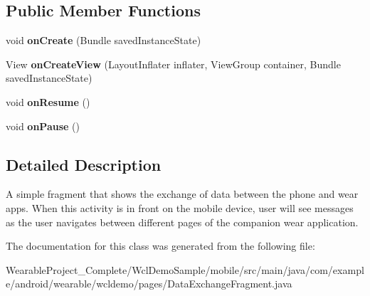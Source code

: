 \subsection*{Public Member Functions}
\begin{DoxyCompactItemize}
\item 
void {\bfseries on\+Create} (Bundle saved\+Instance\+State)\hypertarget{classcom_1_1example_1_1android_1_1wearable_1_1wcldemo_1_1pages_1_1DataExchangeFragment_aea54a1ae5c0d4d7af0897b1f9a17ec26}{}\label{classcom_1_1example_1_1android_1_1wearable_1_1wcldemo_1_1pages_1_1DataExchangeFragment_aea54a1ae5c0d4d7af0897b1f9a17ec26}

\item 
View {\bfseries on\+Create\+View} (Layout\+Inflater inflater, View\+Group container, Bundle saved\+Instance\+State)\hypertarget{classcom_1_1example_1_1android_1_1wearable_1_1wcldemo_1_1pages_1_1DataExchangeFragment_a4026352a4f55d36345545326fcfeff39}{}\label{classcom_1_1example_1_1android_1_1wearable_1_1wcldemo_1_1pages_1_1DataExchangeFragment_a4026352a4f55d36345545326fcfeff39}

\item 
void {\bfseries on\+Resume} ()\hypertarget{classcom_1_1example_1_1android_1_1wearable_1_1wcldemo_1_1pages_1_1DataExchangeFragment_a051a8718e43ef3fc662eb776e890f502}{}\label{classcom_1_1example_1_1android_1_1wearable_1_1wcldemo_1_1pages_1_1DataExchangeFragment_a051a8718e43ef3fc662eb776e890f502}

\item 
void {\bfseries on\+Pause} ()\hypertarget{classcom_1_1example_1_1android_1_1wearable_1_1wcldemo_1_1pages_1_1DataExchangeFragment_aed2aab8f4499eaa77e39511499b183d2}{}\label{classcom_1_1example_1_1android_1_1wearable_1_1wcldemo_1_1pages_1_1DataExchangeFragment_aed2aab8f4499eaa77e39511499b183d2}

\end{DoxyCompactItemize}


\subsection{Detailed Description}
A simple fragment that shows the exchange of data between the phone and wear apps. When this activity is in front on the mobile device, user will see messages as the user navigates between different pages of the companion wear application. 

The documentation for this class was generated from the following file\+:\begin{DoxyCompactItemize}
\item 
Wearable\+Project\+\_\+\+Complete/\+Wcl\+Demo\+Sample/mobile/src/main/java/com/example/android/wearable/wcldemo/pages/Data\+Exchange\+Fragment.\+java\end{DoxyCompactItemize}
